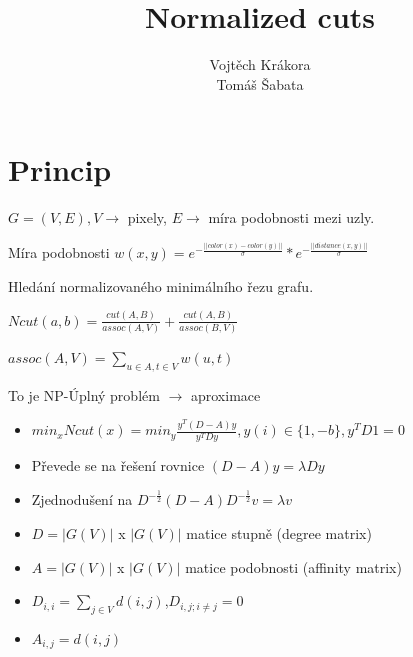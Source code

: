 \documentclass[11pt]{beamer}
\author{Vojtěch Krákora \\ Tomáš Šabata}
\title[\hspace{50mm} \insertframenumber/\inserttotalframenumber]{Normalized cuts}
\institute{České vysoké učení technické v Praze}
\date{}
\begin{document}
\begin{frame}
\titlepage
\end{frame}

\begin{frame}
\tableofcontents
\end{frame}

\section{Princip}
\begin{frame}
\begin{itemize}
\item $G=(V,E), V \rightarrow$ pixely, $E \rightarrow$ míra podobnosti mezi uzly.
\item Míra podobnosti $w(x,y)=e^{-\frac{||color(x) - color(y)||}{\sigma}} * e^{-\frac{||distance(x,y)||}{\sigma}}$
\item Hledání normalizovaného minimálního řezu grafu.

\begin{center}
\item
$Ncut(a,b)=\frac{cut(A,B)}{assoc(A,V)}+\frac{cut(A,B)}{assoc(B,V)}$

$ assoc(A,V)=\sum_{u\in A, t\in V} w(u,t)$

\end{center}
\item To je NP-Úplný problém $\rightarrow$ aproximace
\end{itemize}
\end{frame}

\begin{frame}
\begin{itemize}
\item $min_xNcut(x)=min_y\frac{y^T(D-A)y}{y^TDy}, y(i)\in\{1,-b\},y^TD1=0$
\item Převede se na řešení rovnice $(D-A)y=\lambda Dy$
\item Zjednodušení na $D^{-\frac{1}{2}}(D-A)D^{-\frac{1}{2}}v=\lambda v$
\item $D=|G(V)|$ x $|G(V)|$ matice stupně (degree matrix)
\item $A=|G(V)|$ x $|G(V)|$ matice podobnosti (affinity matrix)
\item $D_{i,i}=\sum_{j\in V}d(i,j)$,$D_{i,j;i\neq j}=0$
\item $A_{i,j}=d(i,j)$
\end{itemize}
\end{frame}
\end{document}
